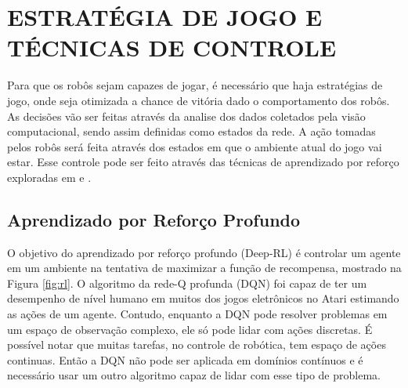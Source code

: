 \section{ESTRATÉGIA DE JOGO E TÉCNICAS DE CONTROLE}\label{strategy}

Para que os robôs sejam capazes de jogar, é necessário que haja estratégias de jogo, onde seja otimizada a chance de vitória dado o comportamento dos robôs. 
As decisões vão ser feitas através da analise dos dados coletados pela visão computacional, sendo assim definidas como estados da rede. 
A ação tomadas pelos robôs será feita através dos estados em que o ambiente atual do jogo vai estar. 
Esse controle pode ser feito através das técnicas de aprendizado por reforço exploradas em \cite{stone2005reinforcement} e \cite{riedmiller2009reinforcement}. 

\subsection{Aprendizado por Reforço Profundo}

O objetivo do aprendizado por reforço profundo (Deep-RL) é controlar um agente em um ambiente na tentativa de maximizar a função de recompensa, mostrado na Figura \ref{fig:rl}.
O algoritmo da rede-Q profunda (DQN) \cite{mnih2013playing} foi capaz de ter um desempenho de nível humano em muitos dos jogos eletrônicos no Atari estimando as ações de um agente.
Contudo, enquanto a DQN pode resolver problemas em um espaço de observação complexo, ele só pode lidar com ações discretas. É possível notar que muitas tarefas, no controle de robótica, tem espaço de ações continuas.
Então a DQN não pode ser aplicada em domínios contínuos e é necessário usar um outro algoritmo capaz de lidar com esse tipo de problema.

